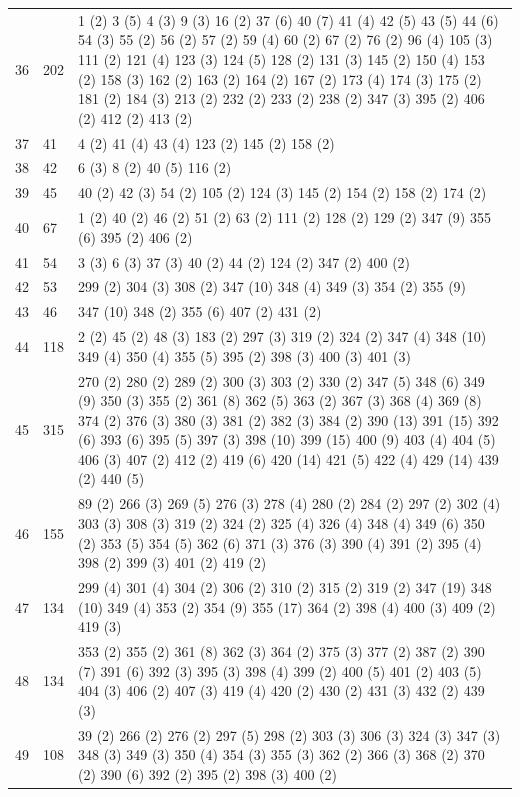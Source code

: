 \begin{landscape}
\begin{longtable}{|p{1.5cm}|p{1.25cm}|p{21cm}|}
36 & 202 & 1 (2) 3 (5) 4 (3) 9 (3) 16 (2) 37 (6) 40 (7) 41 (4) 42 (5) 43 (5) 44 (6) 54 (3) 55 (2) 56 (2) 57 (2) 59 (4) 60 (2) 67 (2) 76 (2) 96 (4) 105 (3) 111 (2) 121 (4) 123 (3) 124 (5) 128 (2) 131 (3) 145 (2) 150 (4) 153 (2) 158 (3) 162 (2) 163 (2) 164 (2) 167 (2) 173 (4) 174 (3) 175 (2) 181 (2) 184 (3) 213 (2) 232 (2) 233 (2) 238 (2) 347 (3) 395 (2) 406 (2) 412 (2) 413 (2) \\
37 & 41 & 4 (2) 41 (4) 43 (4) 123 (2) 145 (2) 158 (2) \\
38 & 42 & 6 (3) 8 (2) 40 (5) 116 (2) \\
39 & 45 & 40 (2) 42 (3) 54 (2) 105 (2) 124 (3) 145 (2) 154 (2) 158 (2) 174 (2) \\
40 & 67 & 1 (2) 40 (2) 46 (2) 51 (2) 63 (2) 111 (2) 128 (2) 129 (2) 347 (9) 355 (6) 395 (2) 406 (2) \\
41 & 54 & 3 (3) 6 (3) 37 (3) 40 (2) 44 (2) 124 (2) 347 (2) 400 (2) \\
42 & 53 & 299 (2) 304 (3) 308 (2) 347 (10) 348 (4) 349 (3) 354 (2) 355 (9) \\
43 & 46 & 347 (10) 348 (2) 355 (6) 407 (2) 431 (2) \\
44 & 118 & 2 (2) 45 (2) 48 (3) 183 (2) 297 (3) 319 (2) 324 (2) 347 (4) 348 (10) 349 (4) 350 (4) 355 (5) 395 (2) 398 (3) 400 (3) 401 (3) \\
45 & 315 & 270 (2) 280 (2) 289 (2) 300 (3) 303 (2) 330 (2) 347 (5) 348 (6) 349 (9) 350 (3) 355 (2) 361 (8) 362 (5) 363 (2) 367 (3) 368 (4) 369 (8) 374 (2) 376 (3) 380 (3) 381 (2) 382 (3) 384 (2) 390 (13) 391 (15) 392 (6) 393 (6) 395 (5) 397 (3) 398 (10) 399 (15) 400 (9) 403 (4) 404 (5) 406 (3) 407 (2) 412 (2) 419 (6) 420 (14) 421 (5) 422 (4) 429 (14) 439 (2) 440 (5) \\
46 & 155 & 89 (2) 266 (3) 269 (5) 276 (3) 278 (4) 280 (2) 284 (2) 297 (2) 302 (4) 303 (3) 308 (3) 319 (2) 324 (2) 325 (4) 326 (4) 348 (4) 349 (6) 350 (2) 353 (5) 354 (5) 362 (6) 371 (3) 376 (3) 390 (4) 391 (2) 395 (4) 398 (2) 399 (3) 401 (2) 419 (2) \\
47 & 134 & 299 (4) 301 (4) 304 (2) 306 (2) 310 (2) 315 (2) 319 (2) 347 (19) 348 (10) 349 (4) 353 (2) 354 (9) 355 (17) 364 (2) 398 (4) 400 (3) 409 (2) 419 (3) \\
48 & 134 & 353 (2) 355 (2) 361 (8) 362 (3) 364 (2) 375 (3) 377 (2) 387 (2) 390 (7) 391 (6) 392 (3) 395 (3) 398 (4) 399 (2) 400 (5) 401 (2) 403 (5) 404 (3) 406 (2) 407 (3) 419 (4) 420 (2) 430 (2) 431 (3) 432 (2) 439 (3) \\
49 & 108 & 39 (2) 266 (2) 276 (2) 297 (5) 298 (2) 303 (3) 306 (3) 324 (3) 347 (3) 348 (3) 349 (3) 350 (4) 354 (3) 355 (3) 362 (2) 366 (3) 368 (2) 370 (2) 390 (6) 392 (2) 395 (2) 398 (3) 400 (2) \\

\end{longtable}
\end{landscape}
